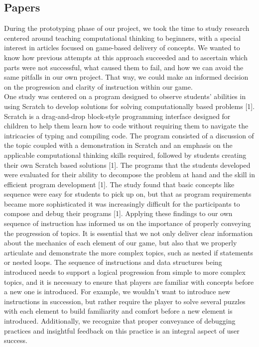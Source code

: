 \subsection{Papers}
During the prototyping phase of our project, we took the time to study research
centered around teaching computational thinking to beginners, with a special
interest in articles focused on game-based delivery of concepts. We wanted to
know how previous attempts at this approach succeeded and to ascertain which
parts were not successful, what caused them to fail, and how we can avoid the
same pitfalls in our own project. That way, we could make an informed decision
on the progression and clarity of instruction within our game.\\

One study was centered on a program designed to observe students’ abilities in
using Scratch to develop solutions for solving computationally based problems
[1]. Scratch is a drag-and-drop block-style programming interface designed for
children to help them learn how to code without requiring them to navigate the
intricacies of typing and compiling code. The program consisted of a discussion
of the topic coupled with a demonstration in Scratch and an emphasis on the
applicable computational thinking skills required, followed by students creating
their own Scratch based solutions [1]. The programs that the students developed
were evaluated for their ability to decompose the problem at hand and the skill
in efficient program development [1]. The study found that basic concepts like
sequence were easy for students to pick up on, but that as program requirements
became more sophisticated it was increasingly difficult for the participants to
compose and debug their programs [1]. Applying these findings to our own
sequence of instruction has informed us on the importance of properly conveying
the progression of topics. It is essential that we not only deliver clear
information about the mechanics of each element of our game, but also that we
properly articulate and demonstrate the more complex topics, such as nested if
statements or nested loops. The sequence of instructions and data structures
being introduced needs to support a logical progression from simple to more
complex topics, and it is necessary to ensure that players are familiar with
concepts before a new one is introduced. For example, we wouldn’t want to
introduce new instructions in succession, but rather require the player to solve
several puzzles with each element to build familiarity and comfort before a new
element is introduced.  Additionally, we recognize that proper conveyance of
debugging practices and insightful feedback on this practice is an integral
aspect of user success.\\

